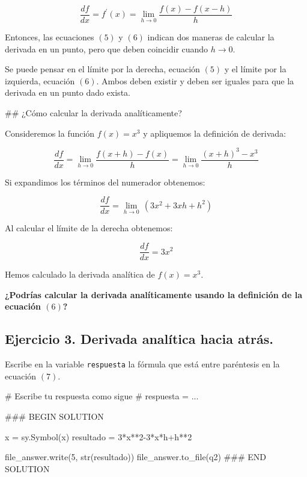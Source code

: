 \documentclass[
  letterpaper,
  DIV=11,
  numbers=noendperiod]{scrreprt}
\newenvironment{Shaded}{\begin{snugshade}}{\end{snugshade}}
\newcommand{\BuiltInTok}[1]{\textcolor[rgb]{0.00,0.23,0.31}{#1}}
\newcommand{\CommentTok}[1]{\textcolor[rgb]{0.37,0.37,0.37}{#1}}
\newcommand{\DecValTok}[1]{\textcolor[rgb]{0.68,0.00,0.00}{#1}}
\newcommand{\NormalTok}[1]{\textcolor[rgb]{0.00,0.23,0.31}{#1}}
\newcommand{\OperatorTok}[1]{\textcolor[rgb]{0.37,0.37,0.37}{#1}}
\newcommand{\RegionMarkerTok}[1]{\textcolor[rgb]{0.00,0.23,0.31}{#1}}
\newcommand{\StringTok}[1]{\textcolor[rgb]{0.13,0.47,0.30}{#1}}
\begin{document}
\[ 
\frac{d f}{dx} = f^\prime(x)=\lim_{h \to 0} \frac{f(x) - f(x-h)}{h} \tag{6}
\]

Entonces, las ecuaciones \((5)\) y \((6)\) indican dos maneras de
calcular la derivada en un punto, pero que deben coincidir cuando
\(h \to 0\).

Se puede pensar en el límite por la derecha, ecuación \((5)\) y el
límite por la izquierda, ecuación \((6)\). Ambos deben existir y deben
ser iguales para que la derivada en un punto dado exista.

\#\# ¿Cómo calcular la derivada analíticamente?

Consideremos la función \(f(x) = x^3\) y apliquemos la definición de
derivada:

\[
\frac{d f}{dx} = \lim_{h \to 0} \frac{f(x + h) - f(x)}{h} = \lim_{h \to 0} \frac{(x + h)^3 - x^3}{h}
\]

Si expandimos los términos del numerador obtenemos:

\[
\frac{d f}{dx} = \lim_{h \to 0} \, (3x^2 + 3 x h + h ^2) \tag{7}
\]

Al calcular el límite de la derecha obtenemos:

\[
\frac{d f}{dx} = 3x^2
\]

Hemos calculado la derivada analítica de \(f(x) = x^3\).

\textbf{¿Podrías calcular la derivada analíticamente usando la
definición de la ecuación \((6)\)?}

\subsection{Ejercicio 3. Derivada analítica hacia
atrás.}\label{ejercicio-3.-derivada-analuxedtica-hacia-atruxe1s.}

Escribe en la variable \texttt{respuesta} la fórmula que está entre
paréntesis en la ecuación \((7)\).

\begin{Shaded}
\begin{Highlighting}[]
\CommentTok{\# Escribe tu respuesta como sigue }
\CommentTok{\# respuesta = ...}

\CommentTok{\#\#\# }\RegionMarkerTok{BEGIN}\CommentTok{ SOLUTION}

\NormalTok{x }\OperatorTok{=}\NormalTok{ sy.Symbol(}\StringTok{\textquotesingle{}x\textquotesingle{}}\NormalTok{)}
\NormalTok{resultado }\OperatorTok{=} \DecValTok{3}\OperatorTok{*}\NormalTok{x}\OperatorTok{**}\DecValTok{2}\OperatorTok{{-}}\DecValTok{3}\OperatorTok{*}\NormalTok{x}\OperatorTok{*}\NormalTok{h}\OperatorTok{+}\NormalTok{h}\OperatorTok{**}\DecValTok{2}

\NormalTok{file\_answer.write(}\StringTok{\textquotesingle{}5\textquotesingle{}}\NormalTok{, }\BuiltInTok{str}\NormalTok{(resultado))}
\NormalTok{file\_answer.to\_file(}\StringTok{\textquotesingle{}q2\textquotesingle{}}\NormalTok{)}
\CommentTok{\#\#\# }\RegionMarkerTok{END}\CommentTok{ SOLUTION}
\end{Highlighting}
\end{Shaded}
\end{document}
